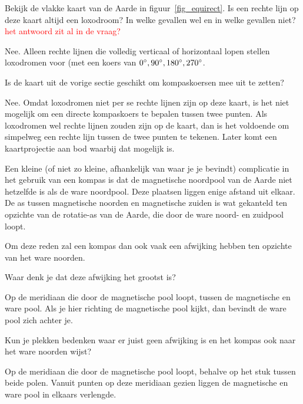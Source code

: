 \begin{opgave}[\ster]
	\begin{subopgave}
		Bekijk de vlakke kaart van de Aarde in figuur~\ref{fig_equirect}. Is een rechte lijn op deze kaart altijd een loxodroom? In welke gevallen wel en in welke gevallen niet? \textcolor{red}{het antwoord zit al in de vraag?}
		\begin{antwoord}
			Nee. Alleen rechte lijnen die volledig verticaal of horizontaal lopen stellen loxodromen voor (met een koers van $0\degree, 90\degree, 180\degree, 270\degree$. 
		\end{antwoord}
	\end{subopgave}
	\begin{subopgave}
		Is de kaart uit de vorige sectie geschikt om kompaskoersen mee uit te zetten?
		\begin{antwoord}
			Nee. Omdat loxodromen niet per se rechte lijnen zijn op deze kaart, is het niet mogelijk om een directe kompaskoers te bepalen tussen twee punten. Als loxodromen wel rechte lijnen zouden zijn op de kaart, dan is het voldoende om simpelweg een rechte lijn tussen de twee punten te tekenen. Later komt een kaartprojectie aan bod waarbij dat mogelijk is.
		\end{antwoord}
	\end{subopgave}
\end{opgave}
	
Een kleine (of niet zo kleine, afhankelijk van waar je je bevindt) complicatie in het gebruik van een kompas is dat de magnetische noordpool van de Aarde niet hetzelfde is als de ware noordpool. Deze plaatsen liggen enige afstand uit elkaar. De as tussen magnetische noorden en magnetische zuiden is wat gekanteld ten opzichte van de rotatie-as van de Aarde, die door de ware noord- en zuidpool loopt.

Om deze reden zal een kompas dan ook vaak een afwijking hebben ten opzichte van het ware noorden.

\begin{opgave}
	\begin{subopgave}
		Waar denk je dat deze afwijking het grootst is?
		\begin{antwoord}
			Op de meridiaan die door de magnetische pool loopt, tussen de magnetische en ware pool. Als je hier richting de magnetische pool kijkt, dan bevindt de ware pool zich achter je.
		\end{antwoord}
	\end{subopgave}
	\begin{subopgave}
		Kun je plekken bedenken waar er juist geen afwijking is en het kompas ook naar het ware noorden wijst?
		\begin{antwoord}
			Op de meridiaan die door de magnetische pool loopt, behalve op het stuk tussen beide polen. Vanuit punten op deze meridiaan gezien liggen de magnetische en ware pool in elkaars verlengde.
		\end{antwoord}
	\end{subopgave}	
\end{opgave}

